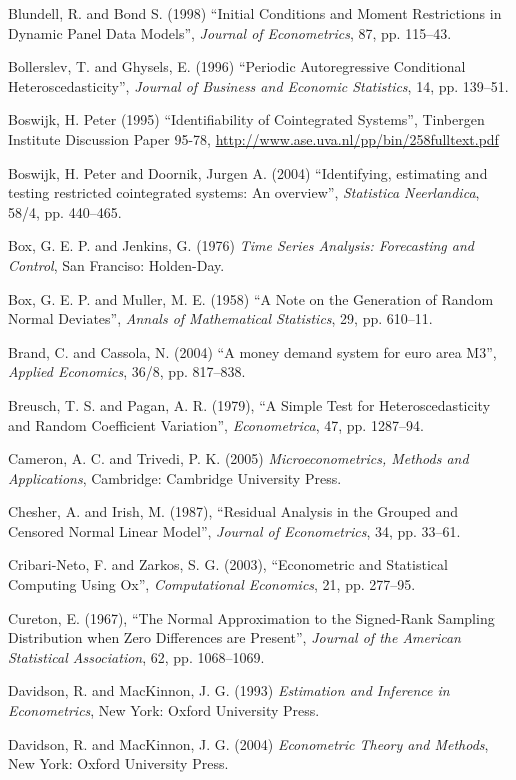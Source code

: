 \begin{thebibliography}
  Blundell, R. and Bond S. (1998) ``Initial Conditions and Moment
  Restrictions in Dynamic Panel Data Models'', \emph{Journal of
    Econometrics}, 87, pp. 115--43.

  Bollerslev, T. and Ghysels, E. (1996) ``Periodic Autoregressive
  Conditional Heteroscedasticity'', \emph{Journal of Business and
    Economic Statistics}, 14, pp. 139--51.

  Boswijk, H. Peter (1995) ``Identifiability of Cointegrated
  Systems'', Tinbergen Institute Discussion Paper 95-78,
  \url{http://www.ase.uva.nl/pp/bin/258fulltext.pdf}

  Boswijk, H. Peter and Doornik, Jurgen A. (2004) ``Identifying,
  estimating and testing restricted cointegrated systems: An
  overview'', \textit{Statistica Neerlandica}, 58/4, pp.
  440--465.

  Box, G. E. P. and Jenkins, G. (1976) \textit{Time Series Analysis:
  Forecasting and Control}, San Franciso: Holden-Day.

  Box, G. E. P. and Muller, M. E.  (1958) ``A Note on the Generation
  of Random Normal Deviates'', \emph{Annals of Mathematical
    Statistics}, 29, pp. 610--11.

  Brand, C. and Cassola, N.  (2004) ``A money demand system for euro
  area M3'', \emph{Applied Economics}, 36/8, pp. 817--838.

  Breusch, T. S. and Pagan, A. R. (1979), ``A Simple Test for
  Heteroscedasticity and Random Coefficient Variation'',
  \emph{Econometrica}, 47, pp. 1287--94.

  Cameron, A. C. and Trivedi, P. K. (2005) \emph{Microeconometrics,
  Methods and Applications}, Cambridge: Cambridge University Press.

  Chesher, A. and Irish, M. (1987), ``Residual Analysis in the Grouped
  and Censored Normal Linear Model'', \emph{Journal of Econometrics},
  34, pp. 33--61.

  Cribari-Neto, F. and Zarkos, S. G. (2003), ``Econometric and
  Statistical Computing Using Ox'', \emph{Computational Economics},
  21, pp. 277--95.

  Cureton, E. (1967), ``The Normal Approximation to the Signed-Rank
  Sampling Distribution when Zero Differences are Present'',
  \emph{Journal of the American Statistical Association}, 62, pp.
  1068--1069.

  Davidson, R. and MacKinnon, J. G. (1993) \emph{Estimation and
    Inference in Econometrics}, New York: Oxford University Press.

  Davidson, R. and MacKinnon, J. G. (2004) \emph{Econometric Theory
    and Methods}, New York: Oxford University Press.


\end{thebibliography}

